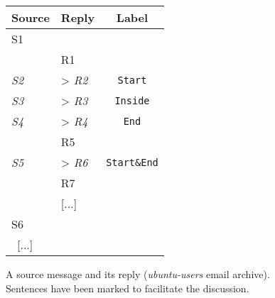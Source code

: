 \begin{figure}
\begin{minipage}{.63\textwidth}
        \caption{A source message and its reply (\textit{ubuntu-users} email archive). Sentences have been marked to facilitate the discussion. %
        }\label{fig:exampleSourCeReplyMessage}
\end{minipage}
\hfill
\begin{minipage}{.3\textwidth}
\small\centering
\begin{tabular}{*{2}{|l}|c|}
\toprule
\textbf{Source} & \textbf{Reply} & \textbf{Label}\\
	\midrule
S1  & & \\
    & R1 & \\
\textit{S2}  & > \textit{R2}& \texttt{Start}\\
\textit{S3}  & > \textit{R3}& \texttt{Inside}\\
\textit{S4}  & > \textit{R4}& \texttt{End}\\
    & R5 & \\
\textit{S5}  & > \textit{R6} & \texttt{Start\&End}\\
    & R7 & \\
    & [...] & \\
S6    &  & \\ \ 
[...] \    &  & \\
	\bottomrule
\end{tabular}


\end{minipage}
\end{figure}
